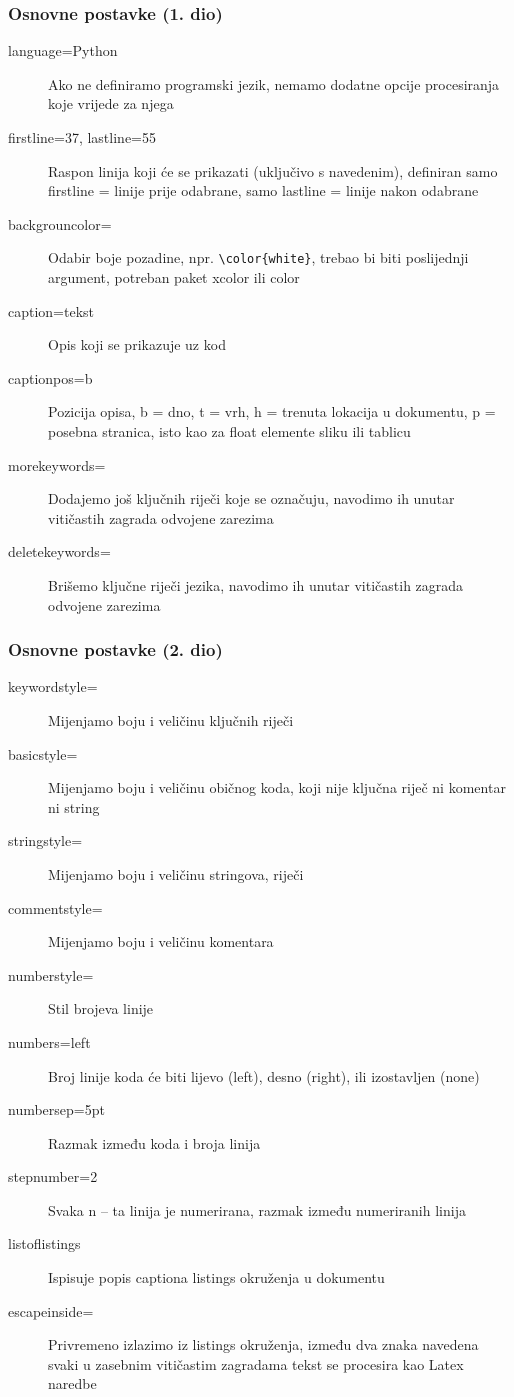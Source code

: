 \documentclass{beamer}
\begin{document}
	\begin{frame}[fragile]
		\frametitle{Osnovne postavke (1. dio)}
		\begin{description}
			\item[language=Python] Ako ne definiramo programski jezik, nemamo dodatne opcije procesiranja koje vrijede za njega
			\item[firstline=37, lastline=55] Raspon linija koji će se prikazati (uključivo s navedenim), definiran samo firstline = linije prije odabrane, samo lastline = linije nakon odabrane
			\item[backgrouncolor=] Odabir boje pozadine, npr. \verb|\color{white}|, trebao bi biti poslijednji argument, potreban paket xcolor ili color
			\item[caption=tekst] Opis koji se prikazuje uz kod
			\item[captionpos=b] Pozicija opisa, b = dno, t = vrh, h = trenuta lokacija u dokumentu, p = posebna stranica, isto kao za float elemente sliku ili tablicu
			\item[morekeywords=] Dodajemo još ključnih riječi koje se označuju, navodimo ih unutar vitičastih zagrada odvojene zarezima
			\item[deletekeywords=] Brišemo ključne riječi jezika, navodimo ih unutar vitičastih zagrada odvojene zarezima
			\end{description}
	\end{frame}
\begin{frame}[fragile]
		\frametitle{Osnovne postavke (2. dio)}
		\begin{description}
			\item[keywordstyle=] Mijenjamo boju i veličinu ključnih riječi
			\item[basicstyle=] Mijenjamo boju i veličinu običnog koda, koji nije ključna riječ ni komentar ni string
			\item[stringstyle=] Mijenjamo boju i veličinu stringova, riječi
			\item[commentstyle=] Mijenjamo boju i veličinu komentara
			\item[numberstyle=] Stil brojeva linije
			\item[numbers=left] Broj linije koda će biti lijevo (left), desno (right), ili izostavljen (none)
			\item[numbersep=5pt] Razmak između koda i broja linija
			\item[stepnumber=2] Svaka n – ta linija je numerirana, razmak između numeriranih linija
			\item[listoflistings] Ispisuje popis captiona listings okruženja u dokumentu
			\item[escapeinside=] Privremeno izlazimo iz listings okruženja, između dva znaka navedena svaki u zasebnim vitičastim zagradama tekst se procesira kao Latex naredbe
			\end{description}
		\end{frame}
\end{document}
